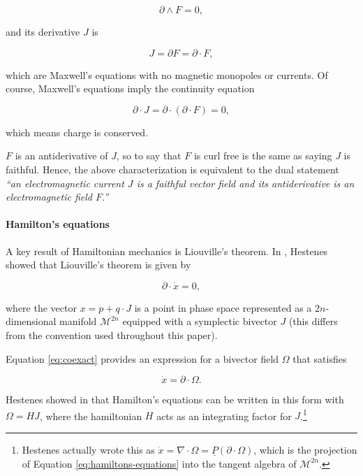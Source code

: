 \documentclass{article}
\begin{document}
\begin{equation}
  \partial \wedge F = 0,
\end{equation}

and its derivative $J$ is

\begin{equation}
  J = \partial F = \partial \cdot F,
\end{equation} 

which are Maxwell's equations with no magnetic monopoles or currents. Of course, Maxwell's equations imply the continuity equation

\begin{equation}
  \partial \cdot J = \partial \cdot (\partial \cdot F) = 0, \label{eq:continuity}
\end{equation} 

which means charge is conserved. 

$F$ is an antiderivative of $J$, so to say that $F$ is curl free is the same as saying $J$ is faithful. Hence, the above characterization is equivalent to the dual statement \emph{``an electromagnetic current $J$ is a faithful vector field and its antiderivative is an electromagnetic field $F$.''}

\paragraph{Hamilton's equations}

A key result of Hamiltonian mechanics is Liouville's theorem. In \cite{hestenes-hamilton}, Hestenes showed that Liouville's theorem is given by

\begin{equation}
  \partial \cdot \dot x = 0,\label{eq:hamilton-continuity}
\end{equation}

where the vector $x = p + q \cdot J$ is a point in phase space represented as a $2n$-dimensional manifold $\mathcal{M}^{2n}$ equipped with a symplectic bivector $J$ (this differs from the convention used throughout this paper).

Equation \ref{eq:coexact} provides an expression for a bivector field $\Omega$ that satisfies

\begin{equation}
  \dot x = \partial \cdot \Omega. \label{eq:hamiltons-equations}
\end{equation}

Hestenes showed in \cite{hestenes-hamilton} that Hamilton's equations can be written in this form with $\Omega = H J$, where the hamiltonian $H$ acts as an integrating factor for $J$.\footnote{Hestenes actually wrote this as $\dot x = \nabla \cdot \Omega = \underline P (\partial \cdot \Omega)$, which is the projection of Equation \ref{eq:hamiltons-equations} into the tangent algebra of $\mathcal{M}^{2n}$.}
\end{document}
